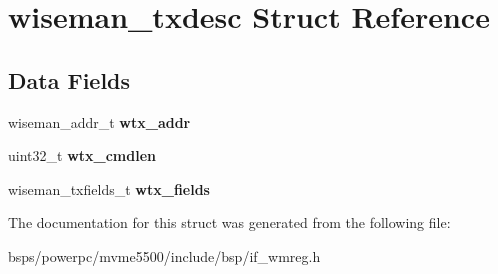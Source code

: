\hypertarget{structwiseman__txdesc}{}\section{wiseman\+\_\+txdesc Struct Reference}
\label{structwiseman__txdesc}
\subsection*{Data Fields}
\begin{DoxyCompactItemize}
\item 
\mbox{\label{structwiseman__txdesc_a11524604014b66aaa448f919649feb4e}} 
wiseman\+\_\+addr\+\_\+t {\bfseries wtx\+\_\+addr}
\item 
\mbox{\label{structwiseman__txdesc_afd78035ebbe09e5348ea7b37c43e1bff}} 
uint32\+\_\+t {\bfseries wtx\+\_\+cmdlen}
\item 
\mbox{\label{structwiseman__txdesc_a8848734ca25c4a3bee12caeedf78eaa4}} 
wiseman\+\_\+txfields\+\_\+t {\bfseries wtx\+\_\+fields}
\end{DoxyCompactItemize}


The documentation for this struct was generated from the following file\+:\begin{DoxyCompactItemize}
\item 
bsps/powerpc/mvme5500/include/bsp/if\+\_\+wmreg.\+h\end{DoxyCompactItemize}
